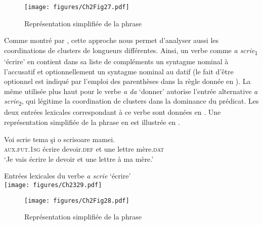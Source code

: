 \z


\begin{figure} 

\texttt{[image: figures/Ch2Fig27.pdf]}%

\caption{Représentation simplifiée de la phrase }
\label{ch2:fig27}
\end{figure}

Comme montré par \citet{Mouret2006,Mouret2007}, cette approche nous permet d’analyser aussi les coordinations de clusters de longueurs différentes. Ainsi, un verbe comme \textit{a scrie}\textsubscript{1} ‘écrire’ en  contient dans sa liste de compléments un syntagme nominal à l’accusatif et optionnellement un syntagme nominal au datif (le fait d’être optionnel est indiqué par l’emploi des parenthèses dans la règle donnée en ). La même  utilisée plus haut pour le verbe \textit{a da} ‘donner’ autorise l’entrée alternative \textit{a scrie}\textsubscript{2}, qui légitime la coordination de clusters dans la dominance du prédicat. Les deux entrées lexicales correspondant à ce verbe sont données en . Une représentation simplifiée de la phrase en  est illustrée en .

\ea \label{ch2:ex328}
\gll Voi scrie  tema  şi  o  scrisoare  mamei.\\
\textsc{aux.fut.1sg} écrire  devoir.\textsc{def}  et  une  lettre  mère.\textsc{dat}\\
\glt ‘Je vais écrire le devoir et une lettre à ma mère.’
\z


\ea \label{ch2:ex329}
Entrées lexicales du verbe \textit{a scrie} ‘écrire’\\
\texttt{[image: figures/Ch2329.pdf]}


\z


\begin{figure} 

\texttt{[image: figures/Ch2Fig28.pdf]}%
\caption{Représentation simplifiée de la phrase }
\label{ch2:fig28}
\end{figure}

